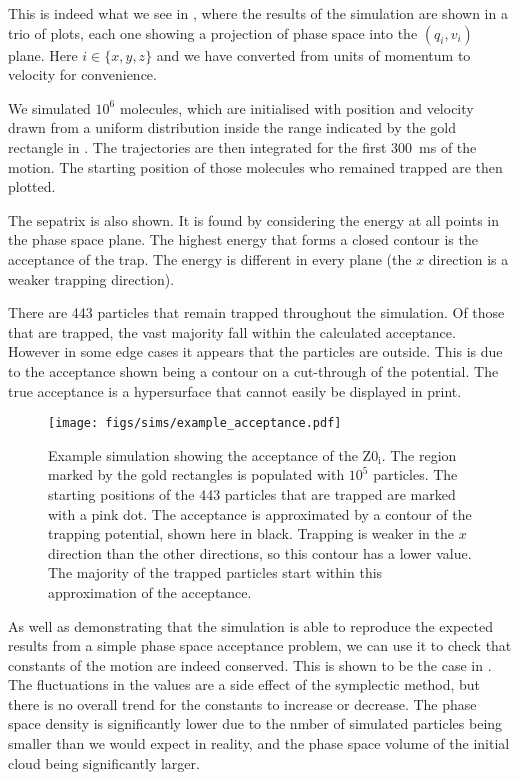 This is indeed what we see in , where the
results of the simulation are shown in a trio of plots, each one showing a
projection of phase space into the $(q_i, v_i)$ plane. Here $i\in\{x, y, z\}$
and we have converted from units of momentum to velocity for convenience. 

We simulated $10^6$ \CaF{} molecules, which are initialised with position and
velocity drawn from a uniform distribution inside the range indicated by the
gold rectangle in . The trajectories are then
integrated for the first \SI{300}{\milli\second} of the motion. The starting
position of those molecules who remained trapped are then plotted.

The sepatrix is also shown. It is found by considering the energy at all
points in the phase space plane. The highest energy that forms a closed contour
is the acceptance of the trap. The energy is different in every plane (the $x$
direction is a weaker trapping direction).

There are 443 particles that remain trapped throughout the simulation. Of those
that are trapped, the vast majority fall within the calculated acceptance.
However in some edge cases it appears that the particles are outside. This is
due to the acceptance shown being a contour on a cut-through of the potential.
The true acceptance is a hypersurface that cannot easily be displayed in print.

\begin{figure}
  \centering
  \texttt{[image: figs/sims/example\_acceptance.pdf]}
  \caption{Example simulation showing the acceptance of the $\mathrm{Z0_i}$.
  The region marked by the gold rectangles is populated with $10^5$ particles.
  The starting positions of the 443 particles that are trapped are marked with a pink dot.
  The acceptance is approximated by a contour of the trapping potential, shown
  here in black. Trapping is weaker in the $x$ direction than the other
  directions, so this contour has a lower value. The majority of the trapped
  particles start within this approximation of the acceptance.}
  \label{design:fig:acceptance}
\end{figure}

As well as demonstrating that the simulation is able to reproduce the expected
results from a simple phase space acceptance problem, we can use it to check
that constants of the motion are indeed conserved. This is shown to be the case
in .  The fluctuations in the values are a
side effect of the symplectic method, but there is no overall trend for the
constants to increase or decrease.  \cite{doi:10.1119/1.2034523} The phase
space density is significantly lower due to the nmber of simulated particles
being smaller than we would expect in reality, and the phase space volume of
the initial cloud being significantly larger.

